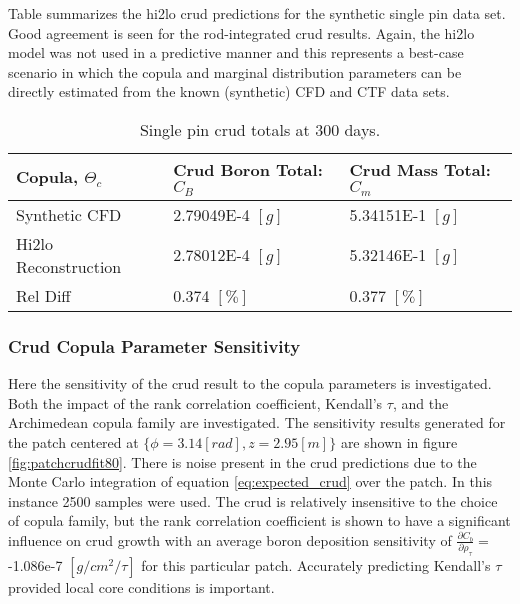 Table \label{tab:crud_totals_1} summarizes the hi2lo crud predictions for the synthetic single pin data set.  Good agreement is seen for the rod-integrated crud results.  Again, the hi2lo model was not used in a predictive manner and this represents a best-case scenario in which the copula and marginal distribution parameters can be directly estimated from the known (synthetic) CFD and CTF data sets.

\begin{table}[h]
    \begin{center}
        \caption[Crud totals for synthetic and hi2lo models.]{Single pin crud totals at 300 days.}
        \begin{tabular}[h]{|l | l | l |}
            \hline
            Copula, $\Theta_c$ & Crud Boron Total: $C_B$ & Crud Mass Total: $C_m$ \\
            \hline  \hline
            Synthetic CFD &  2.79049E-4 $[g]$ & 5.34151E-1 $[g]$ \\
            Hi2lo Reconstruction &  2.78012E-4  $[g]$ & 5.32146E-1 $[g]$ \\
            \hline
            Rel Diff &  0.374 $[\%]$ & 0.377 $[\%]$ \\
            \hline
        \end{tabular}
        \label{tab:crud_totals_1}
    \end{center}
\end{table}



\subsubsection{Crud Copula Parameter Sensitivity}
\label{sec:crud_copula_sensi}

Here the sensitivity of the crud result to the copula parameters is investigated.  Both the impact of the rank correlation coefficient, Kendall's $\tau$, and the Archimedean copula family are investigated.  The sensitivity results generated for the patch centered at $\{ \phi=3.14[rad], z=2.95[m]\}$ are shown in figure \ref{fig:patchcrudfit80}.  There is noise present in the crud predictions due to the Monte Carlo integration of equation \ref{eq:expected_crud} over the patch.  In this instance 2500 samples were used.  The crud is relatively insensitive to the choice of copula family, but the rank correlation coefficient is shown to have a significant influence on crud growth with an average boron deposition sensitivity of $\frac{\partial C_b}{\partial \rho_\tau} =$ -1.086e-7 $[g/cm^2/\tau]$ for this particular patch.  Accurately predicting Kendall's $\tau$ provided local core conditions is important.

